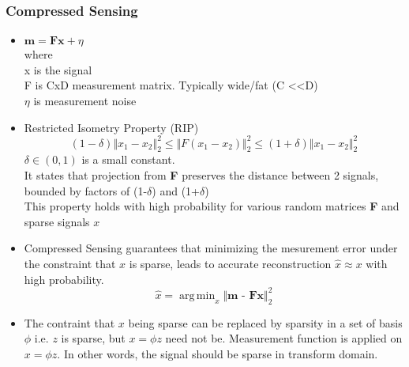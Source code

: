 \documentclass{article}
\DeclareMathOperator*{\argmin}{arg\,min}
\begin{document}
    \subsubsection{Compressed Sensing}\label{subsubsec:Deep_Compressed_Sensing:cs}
    \begin{itemize}
        \item $\textbf{m} = \textbf{Fx} + \eta $\\
        where \\
        x is the signal \\
        F is CxD measurement matrix.
        Typically wide/fat (C \textless \textless D) \\
        $\eta$ is measurement noise \\

        \item Restricted Isometry Property (RIP)
        \[(1-\delta) \Vert {x_1 - x_2} \Vert_2^2 \leq \Vert {F(x_1 - x_2)} \Vert_2^2 \leq (1+\delta) \Vert {x_1 - x_2} \Vert_2^2 \]
        $\delta \in (0,1)$ is a small constant. \\
        It states that projection from \textbf{F} preserves the distance between 2 signals, bounded by factors of (1-$\delta$) and (1+$\delta$) \\
        This property holds with high probability for various random matrices \textbf{F} and sparse signals $x$

        \item Compressed Sensing guarantees that minimizing the mesurement error under the constraint that $x$ is sparse, leads to accurate reconstruction $\hat{x} \approx x$ with high probability.
        \[\hat{x} = \argmin_x \Vert \textbf{m - Fx} \Vert_2^2\]

        \item The contraint that $x$ being sparse can be replaced by sparsity in a set of basis $\phi$ i.e. $z$ is sparse, but $x = \phi z$ need not be.
        Measurement function is applied on $x = \phi z$.
        In other words, the signal should be sparse in transform domain.
    \end{itemize}
\end{document}

